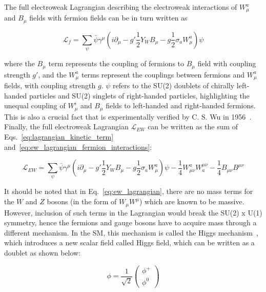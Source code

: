 The full electroweak Lagrangian describing the electroweak interactions of $W_{\mu}^{a}$ and $B_{\mu}$ fields
with fermion fields can be in turn written as

\begin{equation}
        \mathcal{L}_{f}  = \sum_{\psi} \bar{\psi} \gamma^{\mu} \left( i \partial_{\mu} - g' \frac{1}{2} Y_{W} B_{\mu} - g \frac{1}{2} \sigma_{a} W_{\mu}^{a} \right) \psi
    \label{eq:ew_lagrangian_fermion_interactions}
\end{equation}

where the $B_{\mu}$ term represents the coupling of fermions to $B_{\mu}$ field with coupling strength $g'$, and the $W_{\mu}^{a}$ terms
represent the couplings between fermions and $W_{\mu}^{a}$ fields, with coupling strength $g$.
$\psi$ refers to the SU(2) doublets of chirally left-handed particles and SU(2) singlets
of right-handed particles, highlighting the unequal coupling of $W_{\mu}^{i}$ and $B_{\mu}$ fields to left-handed and right-handed fermions.
This is also a crucial fact that is experimentally verified by C. S. Wu in 1956~\cite{Wu:1957my}. Finally, the full electroweak Lagrangian
$\mathcal{L}_{EW}$ can be written as the sum of Eqs.~\ref{eq:lagrangian_kinetic_term} and~\ref{eq:ew_lagrangian_fermion_interactions}:

\begin{equation}
    \mathcal{L}_{EW} = \sum_{\psi} \bar{\psi} \gamma^{\mu} \left( i \partial_{\mu} - g' \frac{1}{2} Y_{W} B_{\mu} - g \frac{1}{2} \sigma_{a} W_{\mu}^{a} \right) \psi - \frac{1}{4} W_{\mu\nu}^{a} W^{\mu\nu}_{a} -\frac{1}{4} B_{\mu\nu} B^{\mu\nu}
    \label{eq:ew_lagrangian}
\end{equation}

It should be noted that in Eq.~\ref{eq:ew_lagrangian}, there are no mass terms for the $W$ and $Z$ bosons (in the form of $W_{\mu} W^{\mu}$)
which are known to be massive. However, inclusion of such terms in the Lagrangian would break the SU(2) x U(1) symmetry, hence the fermions
and gauge bosons have to acquire mass through a different mechanism. In the SM, this mechanism is called the Higgs mechanism~\cite{Higgs:1964pj}, 
which introduces a new scalar field called Higgs field, which can be written as a doublet as shown below:

\begin{equation}
    \phi = \frac{1}{\sqrt{2}} \begin{pmatrix}
        \phi^{+} \\ \phi^{0}
    \end{pmatrix}
    \label{eq:higgs_doublet}
\end{equation}

